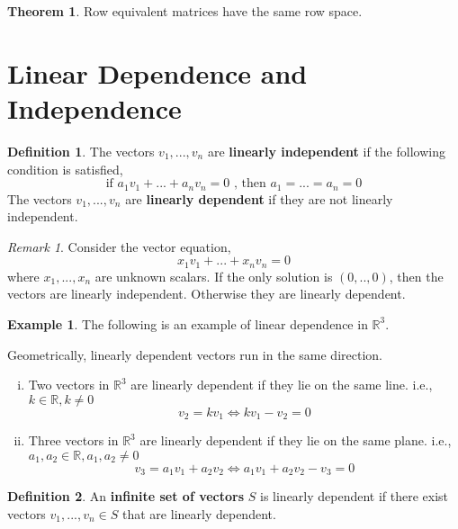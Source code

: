 \documentclass{report}
\theoremstyle{definition}
\newtheorem*{_def}{Definition}
\newtheorem{_thm}{Theorem}[section]
\newtheorem{ex}{Example}[section]
\theoremstyle{remark}
\newtheorem{_rem}{Remark}[section]
\begin{document}
\begin{_thm}
Row equivalent matrices have the same row space.
\end{_thm}

\section{Linear Dependence and Independence}

\begin{_def}
The vectors $v_1,...,v_n$ are \textbf{linearly independent} if the following condition is satisfied,
\[\text{if }a_1v_1+...+a_nv_n=0\text{ , then }a_1=...=a_n=0\]
The vectors $v_1,...,v_n$ are \textbf{linearly dependent} if they are not linearly independent.
\end{_def}

\begin{_rem}
Consider the vector equation,
\[x_1v_1+...+x_nv_n=0\]
where $x_1,...,x_n$ are unknown scalars.
If the only solution is $(0,..,0)$, then the vectors are linearly independent.
Otherwise they are linearly dependent.
\end{_rem}

\begin{ex}
The following is an example of linear dependence in $\mathbb{R}^3$.

Geometrically, linearly dependent vectors run in the same direction.
\begin{enumerate}[i)]
 \item Two vectors in $\mathbb{R}^3$ are linearly dependent if they lie on the same line.
 i.e., $k\in \mathbb{R}, k\neq 0$
 \[v_2=kv_1 \Leftrightarrow kv_1-v_2=0\]
 \item Three vectors in $\mathbb{R}^3$ are linearly dependent if they lie on the same plane.
 i.e., $a_1,a_2\in \mathbb{R}, a_1,a_2\neq 0$
 \[v_3=a_1v_1+a_2v_2 \Leftrightarrow a_1v_1+a_2v_2-v_3=0\]
\end{enumerate}
\end{ex}

\begin{_def}
An \textbf{infinite set of vectors} $S$ is linearly dependent if there exist vectors $v_1,...,v_n\in S$ that are linearly dependent.
\end{_def}
\end{document}
